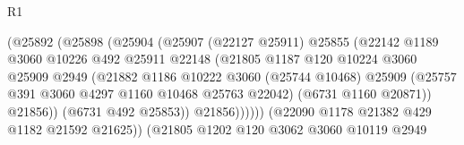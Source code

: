 \begin{lexlean}{R1}
\begin{coremodule}
                                        (@25892
                                          (@25898
                                            (@25904
                                              (@25907
                                                (@22127 @25911)
                                                @25855
                                                (@22142
                                                  @1189
                                                  @3060
                                                  @10226
                                                  @492
                                                  @25911
                                                  @22148
                                                  (@21805
                                                    @1187
                                                    @120
                                                    @10224
                                                    @3060
                                                    @25909
                                                    @2949
                                                    (@21882
                                                      @1186
                                                      @10222
                                                      @3060
                                                      (@25744 @10468)
                                                      @25909
                                                      (@25757
                                                        @391
                                                        @3060
                                                        @4297
                                                        @1160
                                                        @10468
                                                        @25763
                                                        @22042)
                                                      (@6731 @1160 @20871))
                                                    @21856))
                                                (@6731 @492 @25853))
                                              @21856))))))
                                  (@22090 @1178 @21382 @429 @1182 @21592 @21625))
                                (@21805
                                  @1202
                                  @120
                                  @3062
                                  @3060
                                  @10119
                                  @2949

\end{coremodule}
\end{lexlean}
